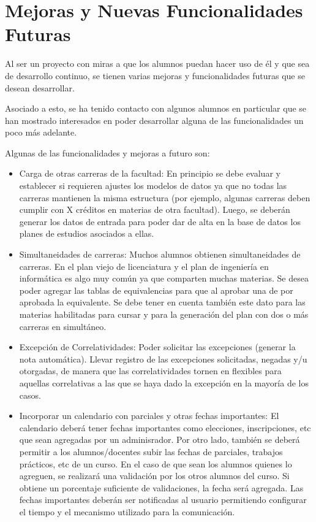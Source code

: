\documentclass[a4paper]{article}
\begin{document}
\newpage
\section{Mejoras y Nuevas Funcionalidades Futuras}

Al ser un proyecto con miras a que los alumnos puedan hacer uso de él y que sea de desarrollo continuo, se tienen varias mejoras y funcionalidades futuras que se desean desarrollar.

Asociado a esto, se ha tenido contacto con algunos alumnos en particular que se han mostrado interesados en poder desarrollar alguna de las funcionalidades un poco más adelante.

Algunas de las funcionalidades y mejoras a futuro son:

\begin{itemize}
	\item Carga de otras carreras de la facultad: En principio se debe evaluar y establecer si requieren ajustes los modelos de datos ya que no todas las carreras mantienen la misma estructura (por ejemplo, algunas carreras deben cumplir con X créditos en materias de otra facultad). Luego, se deberán generar los datos de entrada para poder dar de alta en la base de datos los planes de estudios asociados a ellas.
	
	\item Simultaneidades de carreras: Muchos alumnos obtienen simultaneidades de carreras. En el plan viejo de licenciatura y el plan de ingeniería en informática es algo muy común ya que comparten muchas materias. Se desea poder agregar las tablas de equivalencias para que al aprobar una de por aprobada la equivalente. Se debe tener en cuenta también este dato para las materias habilitadas para cursar y para la generación del plan con dos o más carreras en simultáneo.
	
	\item Excepción de Correlatividades: Poder solicitar las excepciones (generar la nota automática). Llevar registro de las excepciones solicitadas, negadas y/u otorgadas, de manera que las correlatividades tornen en flexibles para aquellas correlativas a las que se haya dado la excepción en la mayoría de los casos.
	
	\item Incorporar un calendario con parciales y otras fechas importantes: El calendario deberá tener fechas importantes como elecciones, inscripciones, etc que sean agregadas por un adminisrador. Por otro lado, también se deberá permitir a los alumnos/docentes subir las fechas de parciales, trabajos prácticos, etc de un curso. En el caso de que sean los alumnos quienes lo agreguen, se realizará una validación por los otros alumnos del curso. Si obtiene un porcentaje suficiente de validaciones, la fecha será agregada. Las fechas importantes deberán ser notificadas al usuario permitiendo configurar el tiempo y el mecanismo utilizado para la comunicación.
	

\end{itemize}
\end{document}
